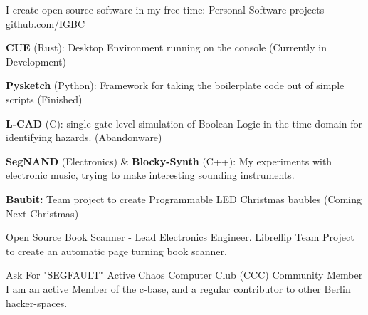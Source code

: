\documentclass[11pt, a4paper]{awesome-cv}
\begin{document}
\begin{cventries}
  \cventry
    {I create open source software in my free time:} %
    {Personal Software projects} %
    {}{\href{https://github.com/IGBC}{github.com/IGBC}} %
    {
    \begin{cvitems} %
        \item {\textbf{CUE} (Rust): Desktop Environment running on the console (Currently in Development)}
        \item {\textbf{Pysketch} (Python): Framework for taking the boilerplate code out of simple scripts (Finished)}
        \item {\textbf{L-CAD} (C): single gate level simulation of Boolean Logic in the time domain for identifying hazards. (Abandonware)}
        \item {\textbf{SegNAND} (Electronics) \& \textbf{Blocky-Synth} (C++): My experiments with electronic music, trying to make interesting sounding instruments.}
        \item {\textbf{Baubit:} Team project to create Programmable LED Christmas baubles (Coming Next Christmas)}
      \end{cvitems} 
     }

  \cventry
    {Open Source Book Scanner - Lead Electronics Engineer.} %
    {Libreflip} %
    {}{} %
    {Team Project to create an automatic page turning book scanner.}

  \cventry
    {Ask For "SEGFAULT"} %
    {Active Chaos Computer Club (CCC) Community Member} %
    {}{} %
    {I am an active Member of the c-base, and a regular contributor to other Berlin hacker-spaces.}
\end{cventries}
\end{document}
